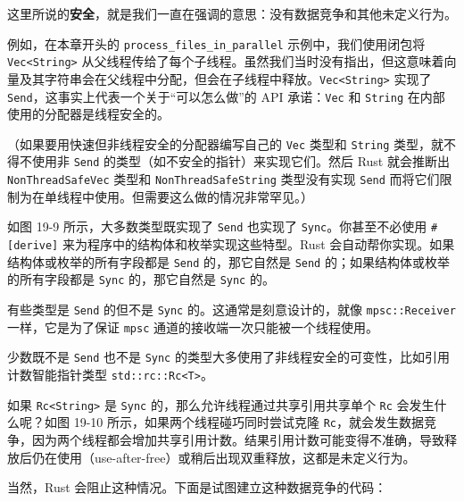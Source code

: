 这里所说的\textbf{安全}，就是我们一直在强调的意思：没有数据竞争和其他未定义行为。

例如，在本章开头的 \texttt{process\_files\_in\_parallel} 示例中，我们使用闭包将 \texttt{Vec<String>} 从父线程传给了每个子线程。虽然我们当时没有指出，但这意味着向量及其字符串会在父线程中分配，但会在子线程中释放。\texttt{Vec<String>} 实现了 \texttt{Send}，这事实上代表一个关于“可以怎么做”的 API 承诺：\texttt{Vec} 和 \texttt{String} 在内部使用的分配器是线程安全的。

（如果要用快速但非线程安全的分配器编写自己的 \texttt{Vec} 类型和 \texttt{String} 类型，就不得不使用非 \texttt{Send} 的类型（如不安全的指针）来实现它们。然后 Rust 就会推断出 \texttt{NonThreadSafeVec} 类型和 \texttt{NonThreadSafeString} 类型没有实现 \texttt{Send} 而将它们限制为在单线程中使用。但需要这么做的情况非常罕见。）

如图 19-9 所示，大多数类型既实现了 \texttt{Send} 也实现了 \texttt{Sync}。你甚至不必使用 \texttt{\#[derive]} 来为程序中的结构体和枚举实现这些特型。Rust 会自动帮你实现。如果结构体或枚举的所有字段都是 \texttt{Send} 的，那它自然是 \texttt{Send} 的；如果结构体或枚举的所有字段都是 \texttt{Sync} 的，那它自然是 \texttt{Sync} 的。

有些类型是 \texttt{Send} 的但不是 \texttt{Sync} 的。这通常是刻意设计的，就像 \texttt{mpsc::Receiver} 一样，它是为了保证 \texttt{mpsc} 通道的接收端一次只能被一个线程使用。

少数既不是 \texttt{Send} 也不是 \texttt{Sync} 的类型大多使用了非线程安全的可变性，比如引用计数智能指针类型 \texttt{std::rc::Rc<T>}。


如果 \texttt{Rc<String>} 是 \texttt{Sync} 的，那么允许线程通过共享引用共享单个 \texttt{Rc} 会发生什么呢？如图 19-10 所示，如果两个线程碰巧同时尝试克隆 \texttt{Rc}，就会发生数据竞争，因为两个线程都会增加共享引用计数。结果引用计数可能变得不准确，导致释放后仍在使用（use-after-free）或稍后出现双重释放，这都是未定义行为。


当然，Rust 会阻止这种情况。下面是试图建立这种数据竞争的代码：

